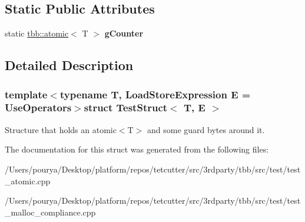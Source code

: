 \subsection*{Static Public Attributes}
\begin{DoxyCompactItemize}
\item 
\hypertarget{structTestStruct_a4be4f1a6b2fe512d32a4fe63b8f757bb}{}static \hyperlink{structtbb_1_1atomic}{tbb\+::atomic}$<$ T $>$ {\bfseries g\+Counter}\label{structTestStruct_a4be4f1a6b2fe512d32a4fe63b8f757bb}

\end{DoxyCompactItemize}


\subsection{Detailed Description}
\subsubsection*{template$<$typename T, Load\+Store\+Expression E = Use\+Operators$>$struct Test\+Struct$<$ T, E $>$}

Structure that holds an atomic$<$\+T$>$ and some guard bytes around it. 

The documentation for this struct was generated from the following files\+:\begin{DoxyCompactItemize}
\item 
/\+Users/pourya/\+Desktop/platform/repos/tetcutter/src/3rdparty/tbb/src/test/test\+\_\+atomic.\+cpp\item 
/\+Users/pourya/\+Desktop/platform/repos/tetcutter/src/3rdparty/tbb/src/test/test\+\_\+malloc\+\_\+compliance.\+cpp\end{DoxyCompactItemize}
